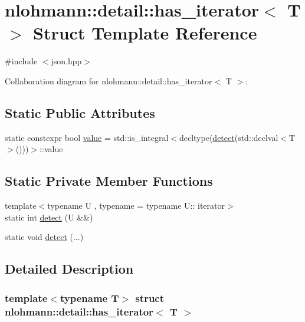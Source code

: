 \hypertarget{structnlohmann_1_1detail_1_1has__iterator}{}\section{nlohmann\+:\+:detail\+:\+:has\+\_\+iterator$<$ T $>$ Struct Template Reference}
\label{structnlohmann_1_1detail_1_1has__iterator}


{\ttfamily \#include $<$json.\+hpp$>$}



Collaboration diagram for nlohmann\+:\+:detail\+:\+:has\+\_\+iterator$<$ T $>$\+:
\subsection*{Static Public Attributes}
\begin{DoxyCompactItemize}
\item 
static constexpr bool \hyperlink{structnlohmann_1_1detail_1_1has__iterator_a6b2d05c363cea5b3f11891b827a4c923}{value} = std\+::is\+\_\+integral$<$decltype(\hyperlink{structnlohmann_1_1detail_1_1has__iterator_a2977f1c63d04faa52d333396bb08e3b5}{detect}(std\+::declval$<$T$>$()))$>$\+::value
\end{DoxyCompactItemize}
\subsection*{Static Private Member Functions}
\begin{DoxyCompactItemize}
\item 
{\footnotesize template$<$typename U , typename  = typename U\+:: iterator$>$ }\\static int \hyperlink{structnlohmann_1_1detail_1_1has__iterator_a2977f1c63d04faa52d333396bb08e3b5}{detect} (U \&\&)
\item 
static void \hyperlink{structnlohmann_1_1detail_1_1has__iterator_a23fd69af6ccf0b408ce8cc7308887e1c}{detect} (...)
\end{DoxyCompactItemize}


\subsection{Detailed Description}
\subsubsection*{template$<$typename T$>$\newline
struct nlohmann\+::detail\+::has\+\_\+iterator$<$ T $>$}



